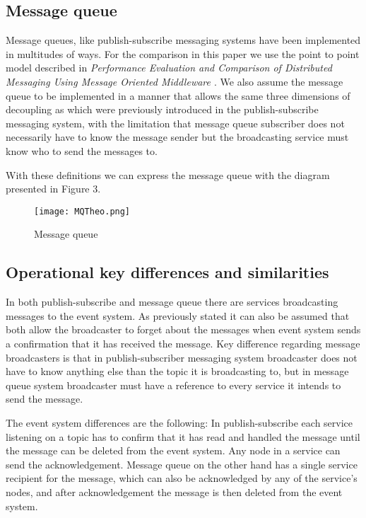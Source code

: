 \documentclass[conference]{IEEEtran}
\begin{document}
\subsection{Message queue}
Message queues, like publish-subscribe messaging systems have been implemented in multitudes of ways. For the comparison in this paper we use the point to point model described in \textit{Performance Evaluation and Comparison of Distributed Messaging Using Message Oriented Middleware \cite{mqperf}}. We also assume the message queue to be implemented in a manner that allows the same three dimensions of decoupling as which were previously introduced in the publish-subscribe messaging system, with the limitation that message queue subscriber does not necessarily have to know the message sender but the broadcasting service must know who to send the messages to.

With these definitions we can express the message queue with the diagram presented in Figure 3.
\begin{figure}[!t]
    \centering
    \texttt{[image: MQTheo.png]}
    \caption{Message queue}
\end{figure}



\subsection{Operational key differences and similarities}
In both publish-subscribe and message queue there are services broadcasting messages to the event system. As previously stated it can also be assumed that both allow the broadcaster to forget about the messages when event system sends a confirmation that it has received the message. Key difference regarding message broadcasters is that in publish-subscriber messaging system broadcaster does not have to know anything else than the topic it is broadcasting to, but in message queue system broadcaster must have a reference to every service it intends to send the message.

The event system differences are the following: In publish-subscribe each service listening on a topic has to confirm that it has read and handled the message until the message can be deleted from the event system. Any node in a service can send the acknowledgement. Message queue on the other hand has a single service recipient for the message, which can also be acknowledged by any of the service’s nodes, and after acknowledgement the message is then deleted from the event system.
\end{document}
